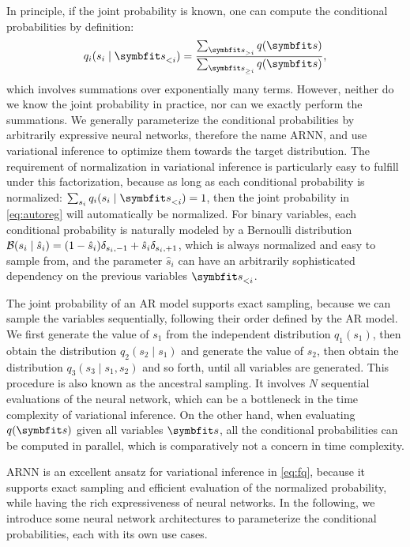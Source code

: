 In principle, if the joint probability is known, one can compute the conditional probabilities by definition:
\begin{equation}
q_i(s_i \mid \vs_{< i}) = \frac{\sum_{\vs_{> i}} q(\vs)}{\sum_{\vs_{\ge i}} q(\vs)},
\end{equation}
which involves summations over exponentially many terms. However, neither do we know the joint probability in practice, nor can we exactly perform the summations. We generally parameterize the conditional probabilities by arbitrarily expressive neural networks, therefore the name ARNN, and use variational inference to optimize them towards the target distribution. The requirement of normalization in variational inference is particularly easy to fulfill under this factorization, because as long as each conditional probability is normalized: $\sum_{s_i} q_i(s_i \mid \vs_{< i}) = 1$, then the joint probability in \cref{eq:autoreg} will automatically be normalized. For binary variables, each conditional probability is naturally modeled by a Bernoulli distribution $\mathcal{B}(s_i \mid \hat{s}_i) = (1 - \hat{s}_i) \delta_{s_i, -1} + \hat{s}_i \delta_{s_i, +1}$, which is always normalized and easy to sample from, and the parameter $\hat{s}_i$ can have an arbitrarily sophisticated dependency on the previous variables $\vs_{< i}$.

The joint probability of an AR model supports exact sampling, because we can sample the variables sequentially, following their order defined by the AR model. We first generate the value of $s_1$ from the independent distribution $q_1(s_1)$, then obtain the distribution $q_2(s_2 \mid s_1)$ and generate the value of $s_2$, then obtain the distribution $q_3(s_3 \mid s_1, s_2)$ and so forth, until all variables are generated. This procedure is also known as the ancestral sampling. It involves $N$ sequential evaluations of the neural network, which can be a bottleneck in the time complexity of variational inference. On the other hand, when evaluating $q(\vs)$ given all variables $\vs$, all the conditional probabilities can be computed in parallel, which is comparatively not a concern in time complexity.

ARNN is an excellent ansatz for variational inference in \cref{eq:fq}, because it supports exact sampling and efficient evaluation of the normalized probability, while having the rich expressiveness of neural networks. In the following, we introduce some neural network architectures to parameterize the conditional probabilities, each with its own use cases.

